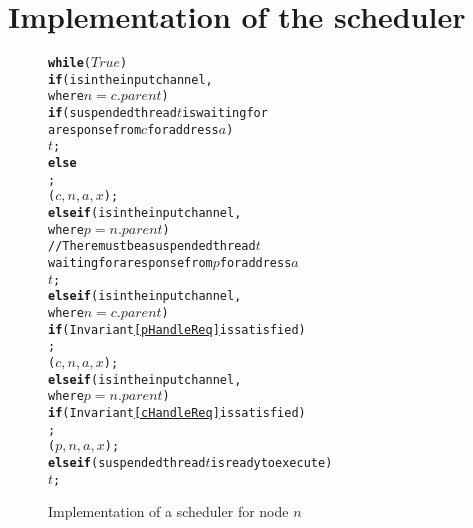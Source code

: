 \section{Implementation of the scheduler}
\label{sec:scheduler}

\newcommand{\lWhile}{\textbf{while}}
\newcommand{\lIf}{\textbf{if}}
\newcommand{\lElsIf}{\textbf{else if}}
\newcommand{\lElse}{\textbf{else}}


\begin{figure}
\small
\begin{boxedminipage}{\linewidth}
\begin{alltt}
\normalfont
\lWhile{} (\(True\)) \bopen
      \lIf ( is in the input channel,
            where \(n = c.parent\)) \bopen
            \lIf (suspended thread \(t\) is waiting for 
                 a response from \(c\) for address \(a\)) \bopen
                   \resume{} \(t\);
            \bclose \lElse \bopen
                   \receive{} ;
                   \start{} \dRespL(\(c, n, a, x\));
            \bclose
      \bclose \lElsIf ( is in the input channel,
            where \(p = n.parent\)) \bopen
                   // There must be a suspended thread \(t\)
                   waiting for a response from \(p\) for address \(a\)
                   \resume{} \(t\);
            \bclose
      \bclose \lElsIf ( is in the input channel,
                     where \(n = c.parent\)) \bopen
             \lIf (Invariant \ref{pHandleReq} is satisfied) \bopen
                   \receive{} ;
                   \start{} \uReq(\(c, n, a, x\));
             \bclose
      \bclose \lElsIf ( is in the input channel,
                  where \(p = n.parent\)) \bopen
             \lIf (Invariant \ref{cHandleReq} is satisfied) \bopen
                   \receive{} ;
                   \start{} \dReq(\(p, n, a, x\));
             \bclose
      \bclose \lElsIf (suspended thread \(t\) is ready to execute) 
             \resume{} \(t\);
\bclose
\end{alltt}
\end{boxedminipage}
\caption{Implementation of a scheduler for node $n$}
\end{figure}
